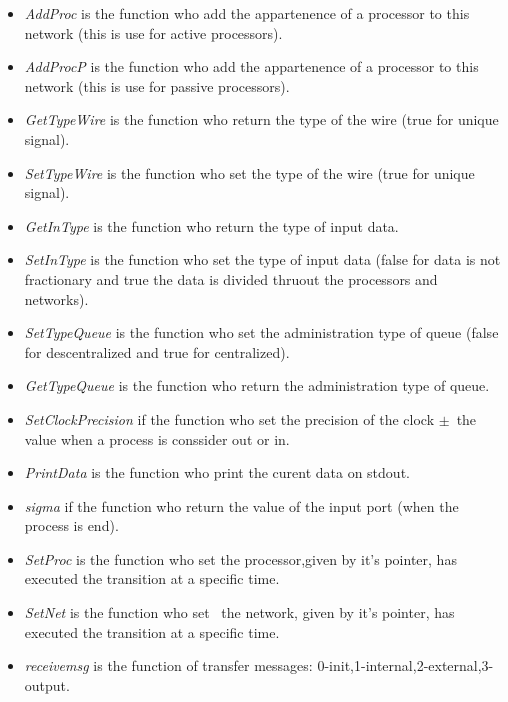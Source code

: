 \documentclass[a4paper,oneside,notitlepage]{article}
\begin{document}
\begin{itemize}
\item \textit{AddProc} is the function who add the appartenence of a
processor to this network (this is use for active processors).

\item \textit{AddProcP} is the function who add the appartenence of a
processor to this network (this is use for passive processors).

\item \textit{GetTypeWire} is the function who return the type of the wire
(true for unique signal).

\item \textit{SetTypeWire} is the function who set the type of the wire
(true for unique signal).

\item \textit{GetInType} is the function who return the type of input data.

\item \textit{SetInType} is the function who set the type of input data
(false for data is not fractionary and true the data is divided thruout the
processors and networks).

\item \textit{SetTypeQueue} is the function who set the administration type
of queue (false for descentralized and true for centralized).

\item \textit{GetTypeQueue} is the function who return the administration
type of queue.

\item \textit{SetClockPrecision} if the function who set the precision of
the clock $\pm $\ the value when a process is conssider out or in.

\item \textit{PrintData} is the function who print the curent data on stdout.

\item \textit{sigma} if the function who return the value of the input port
(when the process is end).

\item \textit{SetProc} is the function who set the processor,given by it's
pointer, has executed the transition at a specific time.

\item \textit{SetNet} is the function who set \ the network, given by it's
pointer, has executed the transition at a specific time.

\item \textit{receivemsg} is the function of transfer messages:
0-init,1-internal,2-external,3-output.
\end{itemize}
\end{document}

